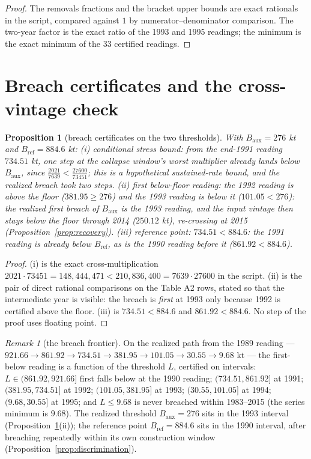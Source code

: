 \documentclass[10pt,twocolumn]{article}
\theoremstyle{plain}
\newtheorem{proposition}[theorem]{Proposition}
\theoremstyle{remark}
\newtheorem{remark}[theorem]{Remark}
\begin{document}
\begin{proof}
The removals fractions and the bracket upper bounds are exact
rationals in the script, compared against \(1\) by
numerator--denominator comparison. The two-year factor is the exact
ratio of the 1993 and 1995 readings; the minimum is the exact minimum
of the 33 certified readings.
\end{proof}

\section{Breach certificates and the cross-vintage check}\label{breach}

\begin{proposition}[breach certificates on the two thresholds]
\label{prop:breach}
With \(B_{\mathrm{aux}} = 276\) kt and \(B_{\mathrm{ref}} = 884.6\)
kt: (i) \emph{conditional stress bound}: from the end-1991 reading
\(734.51\) kt, one step at the collapse window's worst multiplier
already lands below \(B_{\mathrm{aux}}\), since
\(\tfrac{2021}{7639} < \tfrac{27600}{73451}\); this is a hypothetical
sustained-rate bound, and the realized breach took two steps.
(ii) \emph{first below-floor reading}: the 1992 reading is above the
floor (\(381.95 \ge 276\)) and the 1993 reading is below it
(\(101.05 < 276\)): the realized first breach of \(B_{\mathrm{aux}}\)
is the 1993 reading, and the input vintage then stays below the floor
through 2014 (\(250.12\) kt), re-crossing at 2015
(Proposition~\ref{prop:recovery}). (iii) \emph{reference point}:
\(734.51 < 884.6\): the 1991 reading is already below
\(B_{\mathrm{ref}}\), as is the 1990 reading before it
(\(861.92 < 884.6\)).
\end{proposition}

\begin{proof}
(i) is the exact cross-multiplication
\(2021 \cdot 73451 = 148{,}444{,}471 < 210{,}836{,}400 = 7639 \cdot
27600\) in the script. (ii) is the pair of direct rational comparisons
on the Table A2 rows, stated so that the intermediate year is visible:
the breach is \emph{first} at 1993 only because 1992 is certified
above the floor. (iii) is \(734.51 < 884.6\) and \(861.92 < 884.6\).
No step of the proof uses floating point.
\end{proof}

\begin{remark}[the breach frontier]\label{rem:frontier}
On the realized path from the 1989 reading --- \(921.66 \to 861.92 \to
734.51 \to 381.95 \to 101.05 \to 30.55 \to 9.68\) kt --- the
first-below reading is a function of the threshold \(L\), certified on
intervals: \(L \in (861.92, 921.66]\) first falls below at the 1990
reading; \((734.51, 861.92]\) at 1991; \((381.95, 734.51]\) at 1992;
\((101.05, 381.95]\) at 1993; \((30.55, 101.05]\) at 1994;
\((9.68, 30.55]\) at 1995; and \(L \le 9.68\) is never breached within
1983--2015 (the series minimum is \(9.68\)). The realized threshold
\(B_{\mathrm{aux}} = 276\) sits in the 1993 interval
(Proposition~\ref{prop:breach}(ii)); the reference point
\(B_{\mathrm{ref}} = 884.6\) sits in the 1990 interval, after breaching
repeatedly within its own construction window
(Proposition~\ref{prop:discrimination}).
\end{remark}
\end{document}
